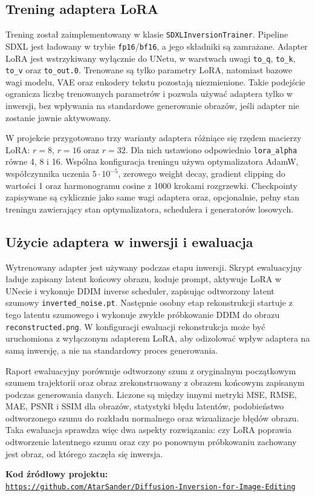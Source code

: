 \documentclass[
    left=2.5cm,
    right=2.5cm,
    top=2.5cm,
    bottom=3cm,
    bindingoffset=6mm,
    nohyphenation=false
]{szablon/eiti/sprawozdanie}
\begin{document}
\subsection{Trening adaptera LoRA}

Trening został zaimplementowany w klasie \texttt{SDXLInversionTrainer}.
Pipeline SDXL jest ładowany w trybie \texttt{fp16}/\texttt{bf16}, a jego
składniki są zamrażane. Adapter LoRA jest wstrzykiwany wyłącznie do UNetu,
w warstwach uwagi \texttt{to\_q}, \texttt{to\_k}, \texttt{to\_v} oraz
\texttt{to\_out.0}. Trenowane są tylko parametry LoRA, natomiast bazowe wagi
modelu, VAE oraz enkodery tekstu pozostają niezmienione. Takie podejście
ogranicza liczbę trenowanych parametrów i pozwala używać adaptera tylko w
inwersji, bez wpływania na standardowe generowanie obrazów, jeśli adapter
nie zostanie jawnie aktywowany.

W projekcie przygotowano trzy warianty adaptera różniące się rzędem macierzy
LoRA: $r=8$, $r=16$ oraz $r=32$. Dla nich ustawiono odpowiednio
\texttt{lora\_alpha} równe 4, 8 i 16. Wspólna konfiguracja treningu używa
optymalizatora AdamW\cite{DBLP:journals/corr/abs-1711-05101}, współczynnika uczenia $5 \cdot 10^{-5}$, zerowego
weight decay, gradient clipping do wartości 1 oraz harmonogramu cosine z
1000 krokami rozgrzewki. Checkpointy zapisywane są cyklicznie jako same wagi adaptera
oraz, opcjonalnie, pełny stan treningu zawierający stan optymalizatora,
schedulera i generatorów losowych.

\subsection{Użycie adaptera w inwersji i ewaluacja}

Wytrenowany adapter jest używany podczas etapu inwersji. Skrypt ewaluacyjny
ładuje zapisany latent końcowy obrazu, koduje prompt, aktywuje LoRA w UNecie
i wykonuje DDIM inverse scheduler, zapisując odtworzony latent szumowy
\texttt{inverted\_noise.pt}. Następnie osobny etap rekonstrukcji startuje z
tego latentu szumowego i wykonuje zwykłe próbkowanie DDIM do obrazu
\texttt{reconstructed.png}. W konfiguracji ewaluacji rekonstrukcja może być
uruchomiona z wyłączonym adapterem LoRA, aby odizolować wpływ adaptera na
samą inwersję, a nie na standardowy proces generowania.

Raport ewaluacyjny porównuje odtworzony szum z oryginalnym początkowym
szumem trajektorii oraz obraz zrekonstruowany z obrazem końcowym zapisanym
podczas generowania danych. Liczone są między innymi metryki MSE, RMSE, MAE,
PSNR i SSIM dla obrazów, statystyki błędu latentów, podobieństwo
odtworzonego szumu do rozkładu normalnego oraz wizualizacje błędów obrazu.
Taka ewaluacja sprawdza więc dwa aspekty rozwiązania: czy LoRA poprawia
odtworzenie latentnego szumu oraz czy po ponownym próbkowaniu zachowany jest
obraz, od którego zaczęła się inwersja.
\begin{githubbox}
\textbf{Kod źródłowy projektu:}\\
\href{https://github.com/AtarSander/Diffusion-Inversion-for-Image-Editing}{\nolinkurl{https://github.com/AtarSander/Diffusion-Inversion-for-Image-Editing}}
\end{githubbox}
\end{document}
